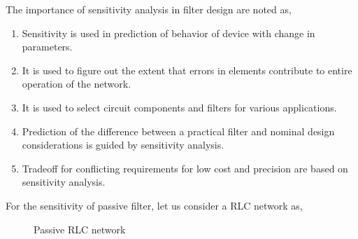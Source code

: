 The importance of sensitivity analysis in filter design are noted as,
\begin{enumerate}
    \item Sensitivity is used in prediction of behavior of device with change in parameters.
    \item It is used to figure out the extent that errors in elements contribute to entire operation of the network.
    \item It is used to select circuit components and filters for various applications.
    \item Prediction of the difference between a practical filter and nominal design considerations is guided by sensitivity analysis.
    \item Tradeoff for conflicting requirements for low cost and precision are based on sensitivity analysis.
\end{enumerate}
For the sensitivity of passive filter, let us consider a RLC network as,
\begin{figure}[H]
    \centering
    \figRLC
    \caption{Passive RLC network}
    \label{fig:rlc}
\end{figure}


